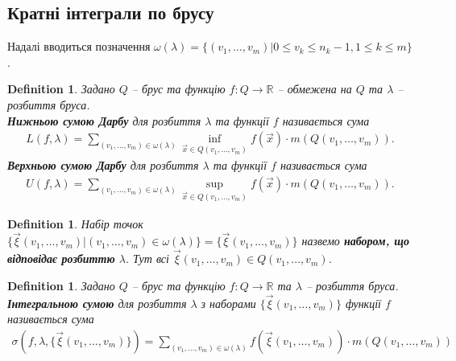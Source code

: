 \documentclass[a4paper, 10pt]{article}
\theoremstyle{theoremdd}
\theoremstyle{theoremdd}
\newtheorem{definition}[theorem]{Definition}
\theoremstyle{theoremdd}
\theoremstyle{theoremdd}
\theoremstyle{theoremdd}
\theoremstyle{theoremdd}
\theoremstyle{theoremdd}
\theoremstyle{theoremdd}
\theoremstyle{theoremdd}
\theoremstyle{theoremdd}
\theoremstyle{theoremdd}
\theoremstyle{theoremdd}
\theoremstyle{theoremdd}
\theoremstyle{theoremdd}
\theoremstyle{theoremdd}
\begin{document}
\subsection{Кратні інтеграли по брусу}
Надалі вводиться позначення $\omega(\lambda) = \{ (v_1,\dots,v_m) | 0 \leq v_k \leq n_k-1, 1 \leq k \leq m \}$.

\begin{definition}
Задано $Q$ -- брус та функцію $f \colon Q \to \mathbb{R}$ -- обмежена на $Q$ та $\lambda$ -- розбиття бруса.\\
\textbf{Нижньою сумою Дарбу} для розбиття $\lambda$ та функції $f$ називається сума
\begin{align*}
L(f,\lambda) = \sum_{(v_1,\dots,v_m) \in \omega(\lambda)} \inf_{\vec{x} \in Q(v_1,\dots,v_m)} f(\vec{x}) \cdot m(Q(v_1,\dots,v_m)).
\end{align*}
\textbf{Верхньою сумою Дарбу} для розбиття $\lambda$ та функції $f$ називається сума
\begin{align*}
U(f,\lambda) = \sum_{(v_1,\dots,v_m) \in \omega(\lambda)} \sup_{\vec{x} \in Q(v_1,\dots,v_m)} f(\vec{x}) \cdot m(Q(v_1,\dots,v_m)).
\end{align*}
\end{definition}

\begin{definition}
Набір точок $\{ \vec{\xi}(v_1,\dots,v_m) | (v_1,\dots,v_m) \in \omega(\lambda) \} = \{ \vec{\xi} (v_1,\dots,v_m) \}$ назвемо \textbf{набором, що відповідає розбиттю} $\lambda$. Тут всі $\vec{\xi}(v_1,\dots,v_m) \in Q(v_1,\dots,v_m)$.
\end{definition}

\begin{definition}
Задано $Q$ -- брус та функцію $f \colon Q \to \mathbb{R}$ та $\lambda$ -- розбиття бруса.\\
\textbf{Інтегральною сумою} для розбиття $\lambda$ з наборами $\{ \vec{\xi}(v_1,\dots,v_m) \}$ функції $f$ називається сума
\begin{align*}
\sigma(f,\lambda, \{ \vec{\xi}(v_1,\dots,v_m) \}) = \sum_{(v_1,\dots,v_m) \in \omega(\lambda)} f(\vec{\xi}(v_1,\dots,v_m)) \cdot m(Q(v_1,\dots,v_m))
\end{align*}
\end{definition}

\iffalse
\begin{figure}[H]
\centering
\texttt{[image: RiemannSumR2.png]}
\end{figure}
\fi
\end{document}
